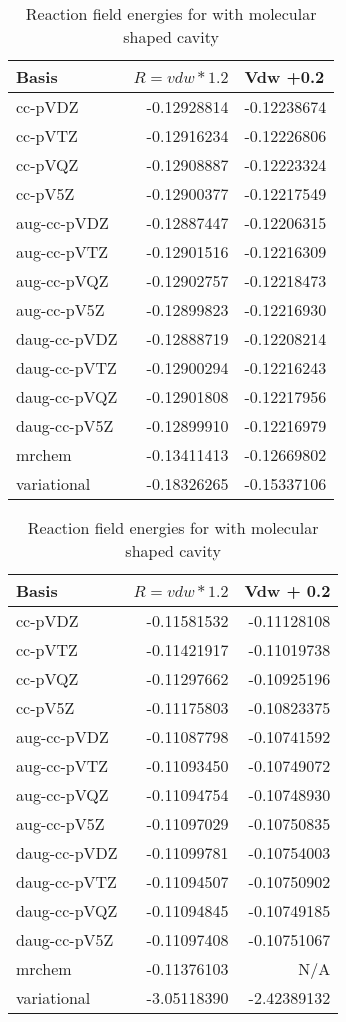 \documentclass[../master_thesis.tex]{subfiles}
\begin{document}
\begin{table}[htbp]
\caption{Reaction field  energies for  with molecular shaped cavity}
\begin{tabular}{l|r|r}
Basis & \multicolumn{1}{l|}{$R = vdw*1.2$} & \multicolumn{1}{l|}{Vdw +0.2} \\ \hline
cc-pVDZ & -0.12928814 & -0.12238674 \\
cc-pVTZ & -0.12916234 & -0.12226806 \\
cc-pVQZ & -0.12908887 & -0.12223324 \\
cc-pV5Z & -0.12900377 & -0.12217549 \\ \hline
aug-cc-pVDZ & -0.12887447 & -0.12206315 \\
aug-cc-pVTZ & -0.12901516 & -0.12216309 \\
aug-cc-pVQZ & -0.12902757 & -0.12218473 \\
aug-cc-pV5Z & -0.12899823 & -0.12216930 \\ \hline
daug-cc-pVDZ & -0.12888719 & -0.12208214 \\
daug-cc-pVTZ & -0.12900294 & -0.12216243 \\
daug-cc-pVQZ & -0.12901808 & -0.12217956 \\
daug-cc-pV5Z & -0.12899910 & -0.12216979 \\ \hline
mrchem & -0.13411413 & -0.12669802 \\
variational & -0.18326265 & -0.15337106 \\
\end{tabular}
\label{tab:abcErnop}
\end{table}

\begin{table}[htbp]
\caption{Reaction field  energies for  with molecular shaped cavity}
\begin{tabular}{l|r|r}
Basis & \multicolumn{1}{l|}{$R = vdw*1.2$} & \multicolumn{1}{l|}{Vdw + 0.2} \\ \hline
cc-pVDZ & -0.11581532 & -0.11128108 \\
cc-pVTZ & -0.11421917 & -0.11019738 \\
cc-pVQZ & -0.11297662 & -0.10925196 \\
cc-pV5Z & -0.11175803 & -0.10823375 \\ \hline
aug-cc-pVDZ & -0.11087798 & -0.10741592 \\
aug-cc-pVTZ & -0.11093450 & -0.10749072 \\
aug-cc-pVQZ & -0.11094754 & -0.10748930 \\
aug-cc-pV5Z & -0.11097029 & -0.10750835 \\ \hline
daug-cc-pVDZ & -0.11099781 & -0.10754003 \\
daug-cc-pVTZ & -0.11094507 & -0.10750902 \\
daug-cc-pVQZ & -0.11094845 & -0.10749185 \\
daug-cc-pV5Z & -0.11097408 & -0.10751067 \\ \hline
mrchem & -0.11376103 & N/A \\
variational & -3.05118390 & -2.42389132 \\
\end{tabular}
\label{tab:abcErcyan}
\end{table}
\end{document}
